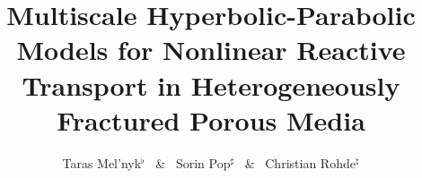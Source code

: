 \documentclass[reqno]{amsart}            %
\numberwithin{equation}{section}
\begin{document}
	
	\title[Reactive Transport in Heterogeneously Fractured Porous Media]
	{Multiscale Hyperbolic-Parabolic Models for Nonlinear Reactive Transport in Heterogeneously Fractured  Porous Media}
	
	\author[Taras Mel'nyk \ \& \ Sorin Pop \ \& \ Christian Rohde]{Taras Mel'nyk$^\flat$ \  \& \ Sorin Pop$^\sharp$ \ \& \ Christian Rohde$^\natural$  }
	\address{\hskip-12pt  $^\flat$ 
		1) \, Institute of Applied Analysis and Numerical Simulation,
		Faculty of Mathematics and Physics, Suttgart University\\
		Pfaffenwaldring 57,\ 70569 Suttgart,  \ Germany,\\
		\ \ 2)
		Department of Mathematical Physics, Faculty of Mathematics and Mechanics\\
		Taras Shevchenko National University of Kyiv\\
		Volodymyrska str. 64,\ 01601 Kyiv,  \ Ukraine
	}
	
	\address{\hskip-12pt  $^\sharp$ 
		Hasselt University, Faculty of Sciences\\
		Agoralaan Gebouw D, \ Diepenbeek 3590, \ Belgium
	}
	
	
	\address{\hskip-12pt  $^\natural$ Institute of Applied Analysis and Numerical Simulation,
		Faculty of Mathematics and Physics, Suttgart University\\
		Pfaffenwaldring 57,\ 70569 Suttgart,  \ Germany
	}
	
	
	
\end{document}
